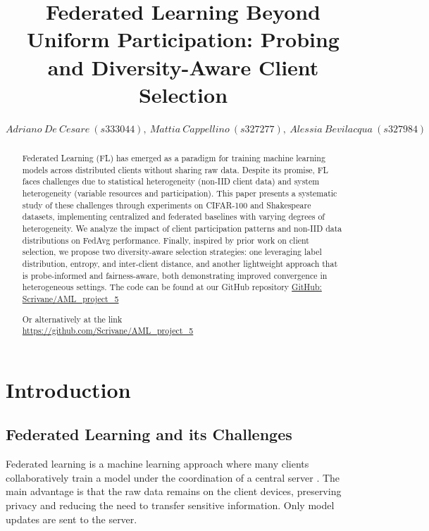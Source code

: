 \documentclass[10pt,twocolumn,letterpaper]{article}
\begin{document}
\title{Federated Learning Beyond Uniform Participation: Probing and Diversity-Aware Client Selection}

\author{
\small{
$Adriano\  De \ Cesare \ (s333044),\  Mattia \  Cappellino\  (s327277), \ Alessia\  Bevilacqua\  (s327984)  
$}
}


\maketitle

\begin{abstract}
  Federated Learning (FL) has emerged as a paradigm for training machine learning models across distributed clients without sharing raw data. 
  Despite its promise, FL faces challenges due to statistical heterogeneity (non-IID client data) and system heterogeneity (variable resources and participation). 
  This paper presents a systematic study of these challenges through experiments on CIFAR-100 and Shakespeare datasets, implementing centralized and federated baselines with varying degrees of heterogeneity. 
  We analyze the impact of client participation patterns and non-IID data distributions on FedAvg performance. 
  Finally, inspired by prior work on client selection, we propose two diversity-aware selection strategies: one leveraging label distribution, entropy, and inter-client distance, and another lightweight approach that is probe-informed and fairness-aware, both demonstrating improved convergence in heterogeneous settings. 
The code can be found at our GitHub repository
  \href{https://github.com/Scrivane/AML_project_5}{GitHub: Scrivane/AML\_project\_5}
  
\text Or alternatively at the link\\
\href{https://github.com/Scrivane/AML\_project\_5}{https://github.com/Scrivane/AML\_project\_5}
\end{abstract}


\section{Introduction}
\label{sec:intro}
\subsection{Federated Learning and its Challenges}
Federated learning is a machine learning approach where many clients collaboratively train a model under the coordination of a central server \cite{kairouz2021advances}. The main advantage is that the raw data remains on the client devices, preserving privacy and reducing the need to transfer sensitive information. Only model updates are sent to the server.
\end{document}
